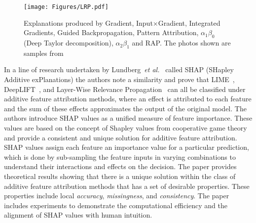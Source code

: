 \begin{figure}[ht!]
	\begin{center}
		\texttt{[image: Figures/LRP.pdf]}
	\end{center}
	\caption{Explanations produced by Gradient, Input$\times$Gradient, Integrated Gradients, Guided Backpropagation, Pattern Attribution, \LRP$\alpha_1\beta_0$ (Deep Taylor decomposition), \LRP$\alpha_2\beta_1$ and RAP. The photos shown are samples from~\cite{NamGCWL20}}
	\label{Fig:LRP}
\end{figure} 



In a line of research undertaken by Lundberg~\textit{et al.}~\cite{LundbergL17} called SHAP (SHapley Additive exPlanations) the authors note a similarity and prove that LIME~\cite{Ribeiro0G16}, DeepLIFT~\cite{ShrikumarGK17}, and Layer-Wise Relevance Propagation~\cite{bach2015pixel} can all be classified under additive feature attribution methods, where an effect is attributed to each feature and the sum of these effects approximates the output of the original model. The authors introduce SHAP values as a unified measure of feature importance. These values are based on the concept of Shapley values from cooperative game theory and provide a consistent and unique solution for additive feature attribution. SHAP values assign each feature an importance value for a particular prediction, which is done by sub-sampling the feature inputs in varying combinations to understand their interactions and effects on the decision. The paper provides theoretical results showing that there is a unique solution within the class of additive feature attribution methods that has a set of desirable properties. These properties include local \emph{accuracy}, \emph{missingness}, and \emph{consistency}. The paper includes experiments to demonstrate the computational efficiency and the alignment of SHAP values with human intuition. 


